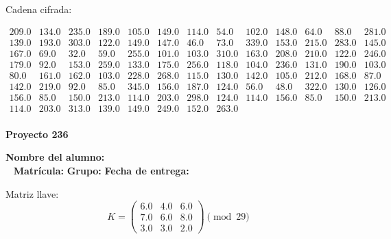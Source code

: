 \documentclass[12pt]{article}
\begin{document}
Cadena cifrada:
\begin{center}
$\begin{array}{lllllllllllll}
209.0 & 134.0 & 235.0 & 189.0 & 105.0 & 149.0 & 114.0 & 54.0 & 102.0 & 148.0 & 64.0 & 88.0 & 281.0\\
139.0 & 193.0 & 303.0 & 122.0 & 149.0 & 147.0 & 46.0 & 73.0 & 339.0 & 153.0 & 215.0 & 283.0 & 145.0\\
167.0 & 69.0 & 32.0 & 59.0 & 255.0 & 101.0 & 103.0 & 310.0 & 163.0 & 208.0 & 210.0 & 122.0 & 246.0\\
179.0 & 92.0 & 153.0 & 259.0 & 133.0 & 175.0 & 256.0 & 118.0 & 104.0 & 236.0 & 131.0 & 190.0 & 103.0\\
80.0 & 161.0 & 162.0 & 103.0 & 228.0 & 268.0 & 115.0 & 130.0 & 142.0 & 105.0 & 212.0 & 168.0 & 87.0\\
142.0 & 219.0 & 92.0 & 85.0 & 345.0 & 156.0 & 187.0 & 124.0 & 56.0 & 48.0 & 322.0 & 130.0 & 126.0\\
156.0 & 85.0 & 150.0 & 213.0 & 114.0 & 203.0 & 298.0 & 124.0 & 114.0 & 156.0 & 85.0 & 150.0 & 213.0\\
114.0 & 203.0 & 313.0 & 139.0 & 149.0 & 249.0 & 152.0 & 263.0\\
\end{array}$
\end{center}

\newpage


\textbf{Proyecto 236}

\textbf{Nombre del alumno:} \underline{\hspace{13cm}}\\\
\vspace{1cm}
\textbf{Matrícula:} \underline{\hspace{4cm}} \hspace{1cm}
\textbf{Grupo:} \underline{\hspace{2cm}}
\textbf{Fecha de entrega:} \underline{\hspace{2cm}}

\medskip

Matriz llave:
\[
K = \begin{pmatrix}
6.0 & 4.0 & 6.0\\
7.0 & 6.0 & 8.0\\
3.0 & 3.0 & 2.0
\end{pmatrix} \pmod{29}
\]
\end{document}
